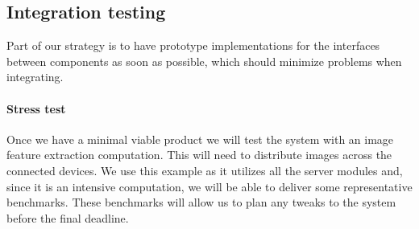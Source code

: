 \documentclass[
  twoside,
  10pt, a4paper
]{article}
\begin{document}
\subsection{Integration testing}

Part of our strategy is to have prototype implementations for the interfaces between components as soon as possible, which should minimize problems when integrating.

\paragraph{Stress test}

Once we have a minimal viable product we will test the system with an image feature extraction computation. This will need to distribute images across the connected devices.
We use this example as it utilizes all the server modules and, since it is an intensive computation, we will be able to deliver some representative benchmarks.
These benchmarks will allow us to plan any tweaks to the system before the final deadline.
\end{document}
